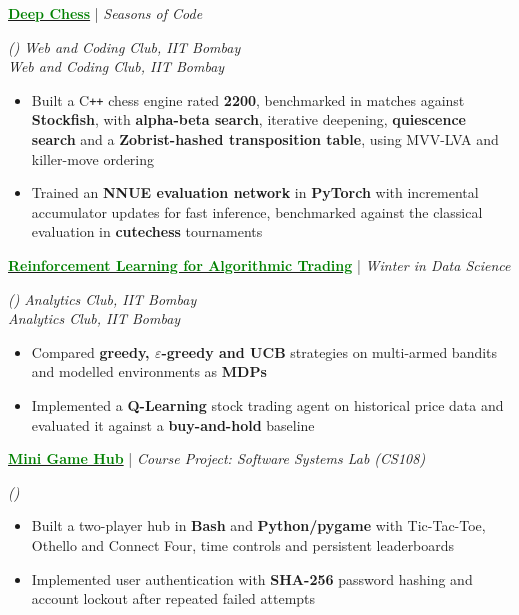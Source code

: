 \documentclass[11pt]{article}
\newcommand{\xfill}[2][1ex]{%
	\dimen0=#2\advance\dimen0 by #1
	\leaders\hrule height \dimen0 depth -#1\hfill
}
\renewcommand{\section}[1]{%
	\par\vspace{9pt}
	{\color{Blue}{\Large\scshape\raggedright #1\xfill[0pt]{0.5pt}}}\par\vspace{3pt}
}
\newcommand{\filldate}[1]{%
	\def\tempdate{#1}%
	\ifx\tempdate\empty\else\strut\hfill{\small\textit{(#1)}}\fi
}
\renewcommand{\subsection}[4]{%
	\def\temp{#4}%
	\par\vspace{5pt}
	{%
		\large
		{\color{Green}\textbf{#1}} | {\sl #2}\filldate{#3}%
		\ifx\temp\empty
		\else
		{\\[0.1em]\fontsize{11}{13.2}\selectfont\sl #4}%
		\fi
	}%
}
\begin{document}
\section{Other Projects}

\subsection{\href{https://github.com/Sahil-M-Deo/Deep-Chess}{\textcolor{Green}{Deep Chess}}}{Seasons of Code}{}{\textit{Web and Coding Club, IIT Bombay}}
\begin{itemize}
    \item Built a C\texttt{++} chess engine rated \textbf{2200}, benchmarked in matches against \textbf{Stockfish}, with \textbf{alpha-beta search}, iterative deepening, \textbf{quiescence search} and a \textbf{Zobrist-hashed transposition table}, using MVV-LVA and killer-move ordering
    \item Trained an \textbf{NNUE evaluation network} in \textbf{PyTorch} with incremental accumulator updates for fast inference, benchmarked against the classical evaluation in \textbf{cutechess} tournaments
\end{itemize}

\subsection{\href{https://github.com/Sahil-M-Deo/WiDS}{\textcolor{Green}{Reinforcement Learning for Algorithmic Trading}}}{Winter in Data Science}{}{\textit{Analytics Club, IIT Bombay}}
\begin{itemize}
    \item Compared \textbf{greedy, $\varepsilon$-greedy and UCB} strategies on multi-armed bandits and modelled environments as \textbf{MDPs}
    \item Implemented a \textbf{Q-Learning} stock trading agent on historical price data and evaluated it against a \textbf{buy-and-hold} baseline
\end{itemize}

\subsection{\href{https://github.com/Sahil-M-Deo/Shanmathi_Software_Labs}{\textcolor{Green}{Mini Game Hub}}}{Course Project: Software Systems Lab (CS108)}{}{}
\begin{itemize}
    \item Built a two-player hub in \textbf{Bash} and \textbf{Python/pygame} with Tic-Tac-Toe, Othello and Connect Four, time controls and persistent leaderboards
    \item Implemented user authentication with \textbf{SHA-256} password hashing and account lockout after repeated failed attempts
\end{itemize}
\end{document}
